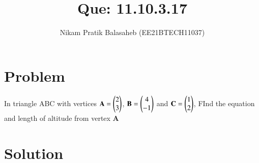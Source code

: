 \documentclass[journal,12pt,twocolumn]{IEEEtran}
\begin{document}
\let\StandardTheFigure\thefigure
\let\vec\mathbf
\renewcommand{\thefigure}{\theproblem}



\def\putbox#1#2#3{\makebox[0in][l]{\makebox[#1][l]{}\raisebox{\baselineskip}[0in][0in]{\raisebox{#2}[0in][0in]{#3}}}}
     \def\rightbox#1{\makebox[0in][r]{#1}}
     \def\centbox#1{\makebox[0in]{#1}}
     \def\topbox#1{\raisebox{-\baselineskip}[0in][0in]{#1}}
     \def\midbox#1{\raisebox{-0.5\baselineskip}[0in][0in]{#1}}

\vspace{3cm}


\title{Que: 11.10.3.17}
\author{Nikam Pratik Balasaheb (EE21BTECH11037)}





\maketitle

\newpage


\bigskip

\renewcommand{\thefigure}{\theenumi}
\renewcommand{\thetable}{\theenumi}

\section{Problem}

In triangle ABC with vertices $\vec{A} = \myvec{2\\3}$, $\vec{B} = \myvec{4\\-1}$ and $\vec{C}= \myvec{1\\2}$, FInd the equation and length of altitude from vertex $\vec{A}$
\section{Solution}
\end{document}
